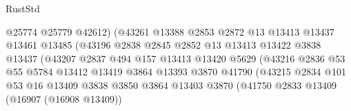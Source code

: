 \begin{lexlean}{RustStd}
\begin{coremodule}
                                      @25774
                                      @25779
                                      @42612)
                                    (@43261
                                      @13388
                                      @2853
                                      @2872
                                      @13
                                      @13413
                                      @13437
                                      @13461
                                      @13485
                                      (@43196
                                        @2838
                                        @2845
                                        @2852
                                        @13
                                        @13413
                                        @13422
                                        @3838
                                        @13437
                                        (@43207
                                          @2837
                                          @494
                                          @157
                                          @13413
                                          @13420
                                          @5629
                                          (@43216
                                            @2836
                                            @53
                                            @55
                                            @5784
                                            @13412
                                            @13419
                                            @3864
                                            @13393
                                            @3870
                                            @41790
                                            (@43215
                                              @2834
                                              @101
                                              @53
                                              @16
                                              @13409
                                              @3838
                                              @3850
                                              @3864
                                              @13403
                                              @3870
                                              (@41750
                                                @2833
                                                @13409
                                                (@16907 (@16908 @13409))

\end{coremodule}
\end{lexlean}
